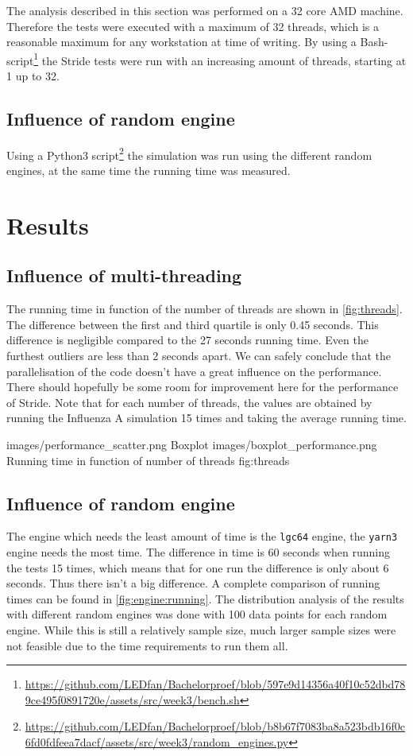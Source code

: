 \documentclass{acmart}
\begin{document}
The analysis described in this section was performed on a 32 core AMD machine. Therefore the tests were executed with a maximum of 32 threads, which is a reasonable maximum for any workstation at time of writing. By using a Bash-script\footnote{\url{https://github.com/LEDfan/Bachelorproef/blob/597e9d14356a40f10c52dbd789ce495f0891720e/assets/src/week3/bench.sh}} %
the Stride tests were run with an increasing amount of threads, starting at 1 up to 32.

\subsection{Influence of random engine}

Using a Python3 script\footnote{\url{https://github.com/LEDfan/Bachelorproef/blob/b8b67f7083ba8a523bdb16f0c6fd0fdfeea7dacf/assets/src/week3/random_engines.py}} %
the simulation was run using the different random engines, at the same time the running time
was measured.

\section{Results}

\subsection{Influence of multi-threading}
The running time in function of the number of threads are shown in \cref{fig:threads}. The difference between the first and third
quartile is only 0.45 seconds. This difference is negligible compared to the 27 seconds running time. Even the furthest outliers are less than 2 seconds apart. We can safely conclude
that the parallelisation of the code doesn’t have a great influence on the performance. There should hopefully be some room for improvement here for the performance of Stride.
Note that for each number of threads, the values are obtained by running the Influenza A simulation 15 times and taking the average running time.

    {images/performance_scatter.png}
    {Boxplot}
    {images/boxplot_performance.png}
    {Running time in function of number of threads}
    {fig:threads}
\subsection{Influence of random engine}
The engine which needs the least amount of time is the \texttt{lgc64} engine, the \texttt{yarn3} engine needs the most time. The difference in time is 60 seconds when running the tests 15 times, which means that for one run the difference is only about 6 seconds. Thus there isn’t a big difference. A complete comparison of running times can be found in \cref{fig:engine:running}.
The distribution analysis of the results with different random engines was done with 100 data points for each random engine. While this is still a relatively sample size, much larger sample sizes were not feasible due to the time requirements to run them all.
\end{document}
